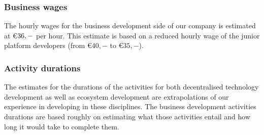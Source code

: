 \subsubsection{Business wages}
The hourly wages for the business development side of our company is estimated at \euro$36,-$ per hour. This estimate is based on a reduced hourly wage of the junior platform developers (from \euro$40,-$ to \euro$35,-$).

\subsubsection{Activity durations}
The estimates for the durations of the activities for both decentralised technology development as well as ecosystem development are extrapolations of our experience in developing in these disciplines. The business development activities durations are based roughly on estimating what those activities entail and how long it would take to complete them.
